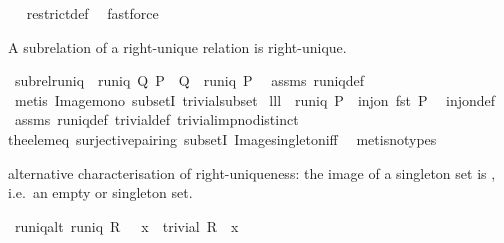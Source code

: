 \begin{isabellebody}
\isadelimproof
\ %
\endisadelimproof
%
\isatagproof
{}\isamarkupfalse%
\ restrict{\isacharunderscore}def\ \isamarkupfalse%
\ fastforce%
\endisatagproof
{\isafoldproof}%
%
\isadelimproof
%
\endisadelimproof
%
\begin{isamarkuptext}%
A subrelation of a right-unique relation is right-unique.%
\end{isamarkuptext}%
\isamarkuptrue%
\isamarkupfalse%
\ subrel{\isacharunderscore}runiq{\isacharcolon}\ \ {\isachardoublequoteopen}runiq\ Q{\isachardoublequoteclose}\ {\isachardoublequoteopen}P\ {\isasymsubseteq}\ Q{\isachardoublequoteclose}\ \ {\isachardoublequoteopen}runiq\ P{\isachardoublequoteclose}\ \isanewline
%
\isadelimproof
%
\endisadelimproof
%
\isatagproof
{}\isamarkupfalse%
\ assms\ runiq{\isacharunderscore}def\ \isamarkupfalse%
\ {\isacharparenleft}metis\ Image{\isacharunderscore}mono\ subsetI\ trivial{\isacharunderscore}subset{\isacharparenright}%
\endisatagproof
{\isafoldproof}%
%
\isadelimproof
\isanewline
%
\endisadelimproof
\isanewline
{}\isamarkupfalse%
\ lll{}{}{\isacharcolon}\ \ {\isachardoublequoteopen}runiq\ P{\isachardoublequoteclose}\ \ {\isachardoublequoteopen}inj{\isacharunderscore}on\ fst\ P{\isachardoublequoteclose}\ \isanewline
%
\isadelimproof
%
\endisadelimproof
%
\isatagproof
{}\isamarkupfalse%
\ inj{\isacharunderscore}on{\isacharunderscore}def\ \isamarkupfalse%
\ assms\ runiq{\isacharunderscore}def\ trivial{\isacharunderscore}def\ trivial{\isacharunderscore}imp{\isacharunderscore}no{\isacharunderscore}distinct\ \isanewline
the{\isacharunderscore}elem{\isacharunderscore}eq\ surjective{\isacharunderscore}pairing\ subsetI\ Image{\isacharunderscore}singleton{\isacharunderscore}iff\ \isamarkupfalse%
\ {\isacharparenleft}metis{\isacharparenleft}no{\isacharunderscore}types{\isacharparenright}{\isacharparenright}%
\endisatagproof
{\isafoldproof}%
%
\isadelimproof
%
\endisadelimproof
%
\begin{isamarkuptext}%
alternative characterisation of right-uniqueness: the image of a singleton set is
   , i.e.\ an empty or singleton set.%
\end{isamarkuptext}%
\isamarkuptrue%
\isamarkupfalse%
\ runiq{\isacharunderscore}alt{\isacharcolon}\ {\isachardoublequoteopen}runiq\ R\ {\isasymlongleftrightarrow}\ {\isacharparenleft}{\isasymforall}\ x\ {\isachardot}\ trivial\ {\isacharparenleft}R\ {\isacharbackquote}{\isacharbackquote}\ {\isacharbraceleft}x{\isacharbraceright}{\isacharparenright}{\isacharparenright}{\isachardoublequoteclose}\ \isanewline

\end{isabellebody}
